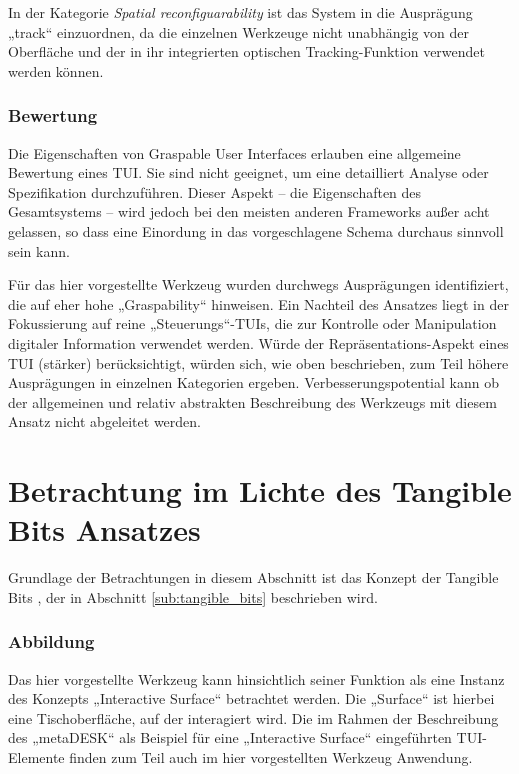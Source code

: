 In der Kategorie \emph{Spatial reconfiguarability} ist das System in die Ausprägung „track“ einzuordnen, da die einzelnen Werkzeuge nicht unabhängig von der Oberfläche und der in ihr integrierten optischen Tracking-Funktion verwendet werden können.

\subsubsection{Bewertung}

Die Eigenschaften von Graspable User Interfaces erlauben eine allgemeine Bewertung eines \gls{TUI}. Sie sind nicht geeignet, um eine detailliert Analyse oder Spezifikation durchzuführen. Dieser Aspekt -- die Eigenschaften des Gesamtsystems -- wird jedoch bei den meisten anderen Frameworks außer acht gelassen, so dass eine Einordung in das vorgeschlagene Schema durchaus sinnvoll sein kann.

Für das hier vorgestellte Werkzeug wurden durchwegs Ausprägungen identifiziert, die auf eher hohe „Graspability“ hinweisen. Ein Nachteil des Ansatzes liegt in der Fokussierung auf reine „Steuerungs“-\glspl{TUI}, die zur Kontrolle oder Manipulation digitaler Information verwendet werden. Würde der Repräsentations-Aspekt eines \gls{TUI} (stärker) berücksichtigt, würden sich, wie oben beschrieben, zum Teil höhere Ausprägungen in einzelnen Kategorien ergeben. Verbesserungspotential kann ob der allgemeinen und relativ abstrakten Beschreibung des Werkzeugs mit diesem Ansatz nicht abgeleitet werden.


\section{Betrachtung im Lichte des Tangible Bits Ansatzes} %
\label{sec:betrachtung_tangible_bits}

Grundlage der Betrachtungen in diesem Abschnitt ist das Konzept der Tangible Bits \citep{Ishii97}, der in Abschnitt \ref{sub:tangible_bits} beschrieben wird.

\subsubsection{Abbildung} 

Das hier vorgestellte Werkzeug kann hinsichtlich seiner Funktion als eine Instanz des Konzepts „Interactive Surface“ betrachtet werden. Die „Surface“ ist hierbei eine Tischoberfläche, auf der interagiert wird. Die im Rahmen der Beschreibung des „metaDESK“ \citep{Ullmer97} als Beispiel für eine „Interactive Surface“ eingeführten \gls{TUI}-Elemente finden zum Teil auch im hier vorgestellten Werkzeug Anwendung.

